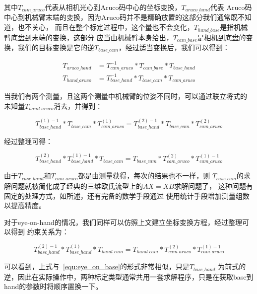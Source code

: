 其中$T_{cam\_aruco}$代表从相机光心到Aruco码中心的坐标变换，$T_{aruco\_hand}$代表
Aruco码中心到机械臂末端的变换，因为Aruco码并不是精确放置的这部分我们通常既不知道，也不关心，
而且在整个标定过程中，这个量也不会变化，$T_{hand\_base}$是指机械臂底盘到末端的变换，这部分
应当由机械臂本身给出，$T_{cam\_base}$是相机到底盘的变换，我们的目标变换是它的逆$T_{base\_cam}$，经过适当变换后，我们可以得到：

\begin{equation}
  \begin{aligned}
    T_{aruco\_hand} &= T_{cam\_aruco}^{-1} * T_{cam\_base} * T_{base\_hand} \\
    T_{hand\_aruco} &= T_{base\_hand}^{-1} * T_{base\_cam} * T_{cam\_aruco}
  \end{aligned}
\end{equation}

当我们有两个测量，且这两个测量中机械臂的位姿不同时，可以通过联立将式的
未知量$T_{hand\_aruco}$消去，并得到：

\begin{equation}
  T_{base\_hand}^{(1)-1} * T_{base\_cam} * T_{cam\_aruco}^{(1)} = 
  T_{base\_hand}^{(2)-1} * T_{base\_cam} * T_{cam\_aruco}^{(2)}
\end{equation}

经过整理可得：

\begin{equation}
  T_{base\_hand}^{(2)} * T_{base\_hand}^{(1) -1} * T_{base\_cam}= 
  T_{base\_cam} * T_{cam\_aruco}^{(2)}  * T_{cam\_aruco}^{(1) -1} 
\label{equ:eye_on_base}
\end{equation}

由于$T_{case\_hand}$和$T_{cam\_aruco}$都是由测量获得，每次的结果也不一样，则
$T_{case\_cam}$的求解问题就被简化成了经典的三维欧氏流型上的$AX = XB$求解问题了，
这种问题有固定的处理方式，如\cite{park1994robo}所述，还有完备的数学手段通过
使用统计手段增加测量组数以提高精度\cite{tsai1989new}。

对于eye-on-hand的情况，我们同样可以仿照上文建立坐标变换方程，经过整理可以得到
约束关系为：

\begin{equation}
  T_{base\_hand}^{(2) -1} * T_{base\_hand}^{(1)} * T_{hand\_cam}= 
  T_{hand\_cam} * T_{cam\_aruco}^{(2)}  * T_{cam\_aruco}^{(1) -1} 
\label{equ:eye_on_hand}
\end{equation}

可以看到，上式与~\ref{equ:eye_on_base}的形式非常相似，只是$T_{base\_hand}$
为前式的逆，因此在实际操作中，两种标定类型通常共用一套求解程序，只是在获取base到
hand的参数时将顺序置换一下。

